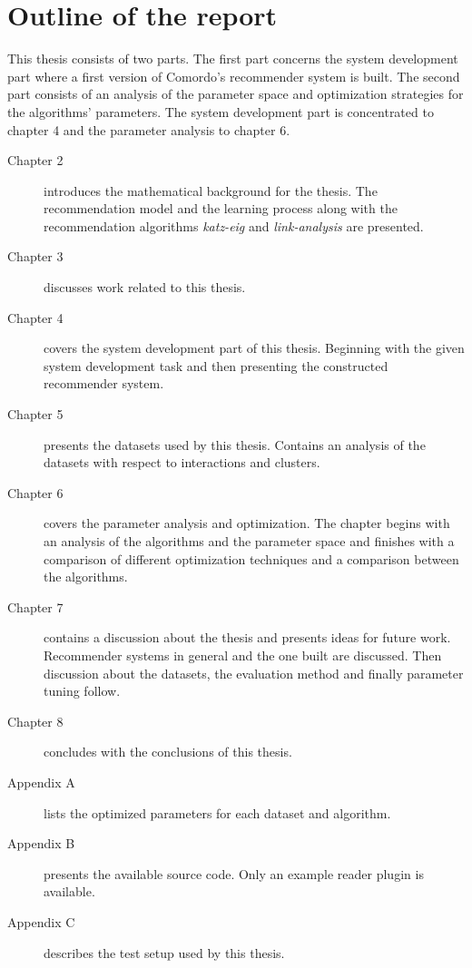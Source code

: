 
\section{Outline of the report}\label{sec:intro:outline}

This thesis consists of two parts. The first part concerns the system development part where a first version of Comordo's recommender system is built. The second part consists of an analysis of the parameter space and optimization strategies for the algorithms' parameters. The system development part is concentrated to chapter 4 and the parameter analysis to chapter 6.

\begin{description}
    \item[Chapter 2] introduces the mathematical background for the thesis. The recommendation model and the learning process along with the recommendation algorithms \textit{katz-eig} and \textit{link-analysis} are presented.
    \item[Chapter 3] discusses work related to this thesis.
    \item[Chapter 4] covers the system development part of this thesis. Beginning with the given system development task and then presenting the constructed recommender system.
    \item[Chapter 5] presents the datasets used by this thesis. Contains an analysis of the datasets with respect to interactions and clusters.
    \item[Chapter 6] covers the parameter analysis and optimization. The chapter begins with an analysis of the algorithms and the parameter space and finishes with a comparison of different optimization techniques and a comparison between the algorithms.
    \item[Chapter 7] contains a discussion about the thesis and presents ideas for future work. Recommender systems in general and the one built are discussed. Then discussion about the datasets, the evaluation method and finally parameter tuning follow.
    \item[Chapter 8] concludes with the conclusions of this thesis.
    \item[Appendix A] lists the optimized parameters for each dataset and algorithm.
    \item[Appendix B] presents the available source code. Only an example reader plugin is available.
    \item[Appendix C] describes the test setup used by this thesis.
\end{description}

